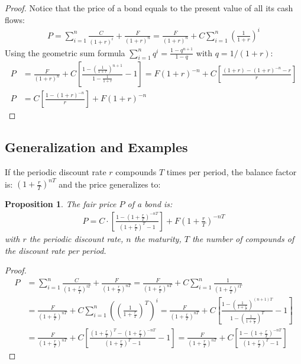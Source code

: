 \documentclass{article}
\theoremstyle{definition}  %
\theoremstyle{plain}  %
\newtheorem{proposition}{Proposition}[section]
\numberwithin{definition}{section}
\numberwithin{proposition}{section}
\numberwithin{theorem}{section}
\numberwithin{equation}{section}
\begin{document}
\begin{proof}
    Notice that the price of a bond equals to the present value of all its cash flows:
    \begin{align*}
        P = \sum_{i = 1}^{n} \frac{C}{(1 + r)^{i}} + \frac{F}{(1 + r)^{n}} = \frac{F}{(1 + r)^{n}} + C \sum_{i = 1}^{n} \left(\frac{1}{1 + r}\right)^{i}
    \end{align*}
    Using the geometric sum formula $\sum_{i = 1}^{n} q^{i} = \frac{1 - q^{n + 1}}{1 - q}$ with $q = 1/(1 + r)$:
    \begin{align*}
        P &= \frac{F}{(1 + r)^{n}} + C \left[\frac{1 - \left(\frac{1}{1 + r}\right)^{n + 1}}{1 - \frac{1}{1 + r}} - 1\right] = F (1 + r)^{-n} + C \left[ \frac{(1 + r) - (1 + r)^{-n} - r}{r} \right] \\
        P &= C \left[\frac{1 - (1 + r)^{-n}}{r}\right] + F(1 + r)^{-n}
    \end{align*}
\end{proof}

\subsection{Generalization and Examples}
\label{subsec:bondgeneralprice}

If the periodic discount rate $r$ compounds $T$ times per period, the balance factor is: $\left(1 + \frac{r}{T} \right)^{nT}$ and the price generalizes to:
\begin{proposition}
    The fair price $P$ of a bond is:
    \begin{align*}
        P = C \cdot \left[\frac{1 - (1 + \frac{r}{T})^{-nT}}{(1 + \frac{r}{T})^{T} - 1}\right] + F \left(1 + \frac{r}{T} \right)^{-nT}
    \end{align*}
    with $r$ the periodic discount rate, $n$ the maturity, $T$ the number of compounds of the discount rate per period.
\end{proposition}

\begin{proof}
    \begin{align*}
    P &= \sum_{i = 1}^{n} \frac{C}{(1 + \frac{r}{T})^{iT}} + \frac{F}{(1 + \frac{r}{T})^{nT}} = \frac{F}{(1 + \frac{r}{T})^{nT}} + C  \sum_{i = 1}^{n} \frac{1}{(1 + \frac{r}{T})^{iT}} \\
    &= \frac{F}{(1 + \frac{r}{T})^{nT}} + C \sum_{i = 1}^{n} \left(\left(\frac{1}{1 + \frac{r}{T}}\right)^{T}\right)^{i} = \frac{F}{(1 + \frac{r}{T})^{nT}} + C \left[\frac{1 - \left(\frac{1}{1 + \frac{r}{T}}\right)^{(n + 1)T}}{1 - \left(\frac{1}{1 + \frac{r}{T}}\right)^{T}} - 1\right] \\
    &= \frac{F}{(1 + \frac{r}{T})^{nT}} + C \left[\frac{\left(1 + \frac{r}{T}\right)^{T} - \left(1 + \frac{r}{T}\right)^{-nT}}{\left(1 + \frac{r}{T}\right)^{T} - 1} - 1\right] = \frac{F}{(1 + \frac{r}{T})^{nT}} + C \left[\frac{1 - \left(1 + \frac{r}{T}\right)^{-nT}}{\left(1 + \frac{r}{T}\right)^{T} - 1}\right]
\end{align*}
\end{proof}
\end{document}
